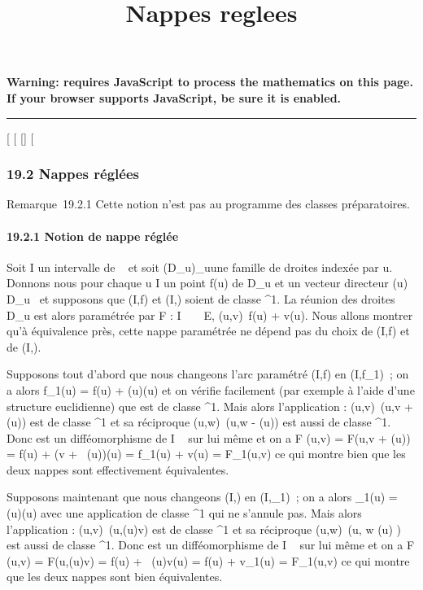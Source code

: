 \documentclass[]{article}
\title{Nappes reglees}
\author{}
\date{}
\begin{document}
\maketitle

\textbf{Warning: 
requires JavaScript to process the mathematics on this page.\\ If your
browser supports JavaScript, be sure it is enabled.}

\begin{center}\rule{3in}{0.4pt}\end{center}

[
[
[]
[

\subsubsection{19.2 Nappes réglées}

Remarque~19.2.1 Cette notion n'est pas au programme des classes
préparatoires.

\paragraph{19.2.1 Notion de nappe réglée}

Soit I un intervalle de ~ et soit (D_u)_u\inI une
famille de droites indexée par u. Donnons nous pour chaque u \in I un
point f(u) de D_u et un vecteur directeur
\vecg(u) \in\overrightarrow
D_u \diagdown\0\ et supposons que
(I,f) et (I,\vecg) soient de classe ^1.
La réunion des droites D_u est alors paramétrée par F : I \times {}~ \rightarrow~
E, (u,v)\mapsto~f(u) + v\vecg(u).
Nous allons montrer qu'à équivalence près, cette nappe paramétrée ne
dépend pas du choix de (I,f) et de (I,\vecg).

Supposons tout d'abord que nous changeons l'arc paramétré (I,f) en
(I,f_1)~; on a alors f_1(u) = f(u) +
\phi(u)\vecg(u) et on vérifie facilement (par exemple à
l'aide d'une structure euclidienne) que \phi est de classe ^1.
Mais alors l'application \theta : (u,v)\mapsto~(u,v +
\phi(u)) est de classe ^1 et sa réciproque
(u,w)\mapsto~(u,w - \phi(u)) est aussi de classe
^1. Donc \theta est un difféomorphisme de I \times {}~ sur lui même et
on a F \cdot \theta(u,v) = F(u,v + \phi(u)) = f(u) + (v +
\alpha~(u))\vecg(u) = f_1(u) +
v\vecg(u) = F_1(u,v) ce qui montre bien que
les deux nappes sont effectivement équivalentes.

Supposons maintenant que nous changeons (I,\vecg) en
(I,\vecg_1)~; on a alors
\vecg_1(u) = \psi(u)\vecg(u)
avec une application \psi de classe ^1 qui ne s'annule pas.
Mais alors l'application \theta : (u,v)\mapsto~(u,\psi(u)v)
est de classe ^1 et sa réciproque
(u,w)\mapsto~(u, w \over \psi(u) )
est aussi de classe ^1. Donc \theta est un difféomorphisme de I \times
{}~ sur lui même et on a F \cdot \theta(u,v) = F(u,\psi(u)v) = f(u) +
\beta~(u)v\vecg(u) = f(u) +
v\vecg_1(u) = F_1(u,v) ce qui
montre que les deux nappes sont bien équivalentes.
\end{document}

